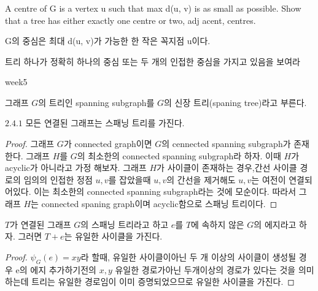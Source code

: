 \subsubsection{} 
%
\subsubsection{} 
%
\subsubsection{} 
A centre of G is a vertex u such that max d(u, v) is as small as possible.
Show that a tree has either exactly one centre or two,
adj acent, centres.


G의 중심은 최대 d(u, v)가 가능한 한 작은 꼭지점 u이다.

트리 하나가 정확히 하나의 중심 또는 두 개의 인접한 중심을 가지고 있음을 보여라

week5

\begin{dfn}
    그래프 $G$의 트리인 spanning subgraph를 $G$의 신장 트리(spaning tree)라고 부른다.
\end{dfn}

\begin{corollary}
    $2.4.1$ 모든 연결된 그래프는 스패닝 트리를 가진다.
\end{corollary}

\begin{proof}
    그래프 $G$가 connected graph이면 $G$의 cennected spanning subgraph가 존재한다.
    그래프 $H$를 $G$의 최소한의 connected spanning subgraph라 하자.
    이때 $H$가 acyclic가 아니라고 가정 해보자.
    그래프 $H$가 사이클이 존재하는 경우,간선 사이클 경로의 임의의 인접한 정점 $u, v$를 잡았을때 $u, v$의 간선을 제거해도 $u, v$는 여전이 연결되어있다. 이는 최소한의 connected spanning subgraph라는 것에 모순이다. 
    따라서 그래프 $H$는 connected spaning graph이며 acyclic함으로 스패닝 트리이다.
\end{proof}

\begin{theorem}
    $T$가 연결된 그래프 $G$의 스패닝 트리라고 하고 $e$를 $T$에 속하지 않은 $G$의 에지라고 하자. 그러면 $T + e$는 유일한 사이클을 가진다.
\end{theorem}
\begin{proof}
    $\psi_G(e) = xy$라 할때, 유일한 사이클이아닌 두 개 이상의 사이클이 생성될 경우  e의 에지 추가하기전의 $x, y$ 유일한 경로가아닌 두개이상의 경로가 있다는 것을 의미하는데 트리는 유일한 경로임이 이미 증명되었으므로 유일한 사이클을 가진다.
\end{proof}
